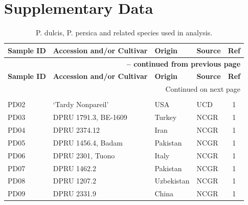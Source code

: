 \documentclass[12pt]{article}
\begin{document}
\section*{Supplementary Data}
\begin{center}
\begin{longtable}{llllc}
\caption{P. dulcis, P. persica and related species used in analysis.} \label{sampledetails} \\
\hline \hline
\multicolumn{1}{l}{\textbf{Sample ID}} &
\multicolumn{1}{l}{\textbf{Accession and/or Cultivar}} &
\multicolumn{1}{l}{\textbf{Origin}} &
\multicolumn{1}{l}{\textbf{Source}} &
\multicolumn{1}{c}{\textbf{Ref}}\\
\hline 
\endfirsthead

\multicolumn{5}{r}{{\bfseries \tablename\ \thetable{} -- continued from previous page}} \\
\hline \multicolumn{1}{l}{\textbf{Sample ID}} &
\multicolumn{1}{l}{\textbf{Accession and/or Cultivar}} &
\multicolumn{1}{l}{\textbf{Origin}} &
\multicolumn{1}{l}{\textbf{Source}} &
\multicolumn{1}{c}{\textbf{Ref}} \\ \hline 
\endhead
%
\hline \multicolumn{5}{r}{{Continued on next page}} \\ \hline \hline
\endfoot
%
\endlastfoot
%
	\multicolumn{5}{l}{\emph{P. dulcis}}  \\
	PD02 &‘Tardy Nonpareil’ &USA &UCD &1\\
	PD03 &DPRU 1791.3, BE-1609 &Turkey &NCGR &1\\
	PD04 &DPRU 2374.12 &Iran &NCGR &1\\
	PD05 &DPRU 1456.4, Badam &Pakistan &NCGR &1\\
	PD06 &DPRU 2301, Tuono &Italy &NCGR &1\\
	PD07 &DPRU 1462.2 &Pakistan &NCGR &1\\
	PD08 &DPRU 1207.2 &Uzbekistan &NCGR &1\\
	PD09 &DPRU 2331.9 &China &NCGR &1\\

\end{longtable}
\end{center}
\end{document}
